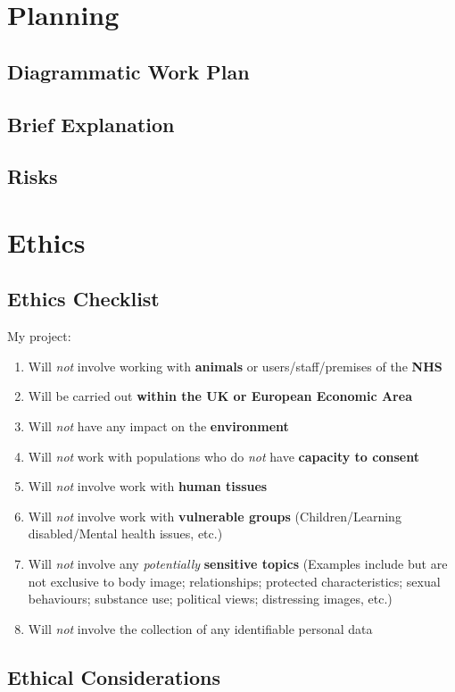 \documentclass[a4paper]{article}
\begin{document}
\section{Planning}
\subsection{Diagrammatic Work Plan}

\subsection{Brief Explanation}

\subsection{Risks}


\clearpage

\section{Ethics}
\subsection{Ethics Checklist}
My project:
\begin{enumerate}
    \item Will \textit{not} involve working with \textbf{animals} or
        users/staff/premises of the \textbf{NHS}
    \item Will be carried out \textbf{within the UK or European
        Economic Area}
    \item Will \textit{not} have any impact on the \textbf{environment}
    \item Will \textit{not} work with populations who do \textit{not}
        have \textbf{capacity to consent}
    \item Will \textit{not} involve work with \textbf{human tissues}
    \item Will \textit{not} involve work with \textbf{vulnerable groups}
        (Children/Learning disabled/Mental health issues, etc.)
    \item Will \textit{not} involve any \textit{potentially}
        \textbf{sensitive topics} (Examples include but are not
        exclusive to body image; relationships; protected
        characteristics; sexual behaviours; substance use;
        political views; distressing images, etc.)
    \item Will \textit{not} involve the collection of any identifiable
        personal data
\end{enumerate}

\subsection{Ethical Considerations}

\clearpage


\printbibliography[heading=bibnumbered]
\end{document}
